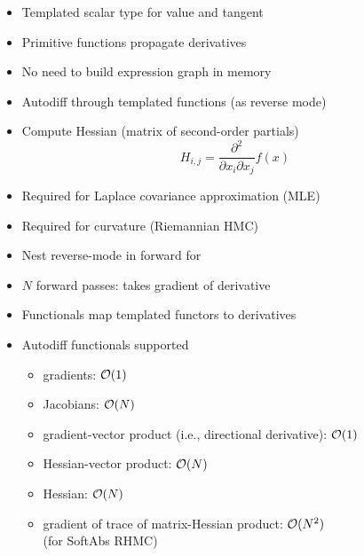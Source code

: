 \documentclass[10pt]{report}
\begin{document}
%
\begin{itemize}
\item Templated scalar type for value and tangent
\item Primitive functions propagate derivatives
\item No need to build expression graph in memory
\item Autodiff through templated functions (as reverse mode)
\end{itemize}

%
\begin{itemize}
\item Compute Hessian (matrix of second-order partials)
\[
H_{i,j} = \frac{\partial^2}{\partial x_i \partial x_j} f(x)
\]
\item Required for Laplace covariance approximation (MLE)
\item Required for curvature (Riemannian HMC)
\item Nest reverse-mode in forward for 
\item $N$ forward passes: takes gradient of derivative
\end{itemize}


%
\begin{itemize}
\item Functionals map templated functors to derivatives
\item Autodiff functionals supported
  \begin{itemize}\small
  \item gradients: ${\mathcal{O}}(1)$
  \item Jacobians: ${\mathcal{O}}(N)$
  \item gradient-vector product (i.e., directional derivative): ${\mathcal{O}}(1)$
  \item Hessian-vector product: ${\mathcal{O}}(N)$
  \item Hessian: ${\mathcal{O}}(N)$
  \item gradient of trace of matrix-Hessian product: ${\mathcal{O}}(N^2)$
    \\ {\footnotesize (for SoftAbs RHMC)}
  \end{itemize}
\end{itemize}
\end{document}
